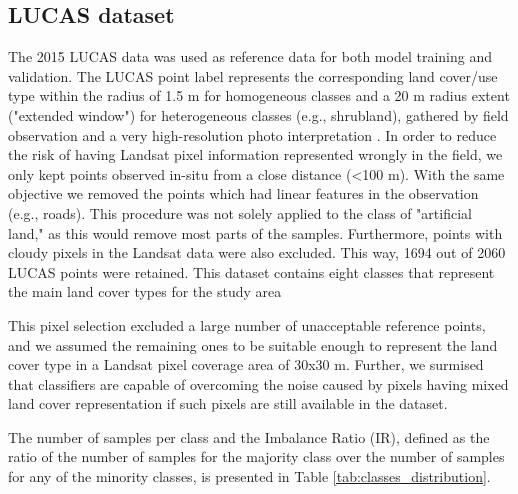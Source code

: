 \documentclass[remotesensing,article,submit,moreauthors,pdftex]{Definitions/mdpi}
\begin{document}
\subsection{LUCAS dataset}

The 2015 LUCAS data was used as reference data for both model training and
validation. The LUCAS point label represents the corresponding land cover/use
type within the radius of 1.5 m for homogeneous classes and a 20 m radius
extent ("extended window") for heterogeneous classes (e.g., shrubland), gathered
by field observation and a very high-resolution photo interpretation
\cite{LUCAS2015C1}. In order to reduce the risk of having Landsat pixel
information represented wrongly in the field, we only kept points observed
in-situ from a close distance (<100 m). With the same objective we removed the
points which had linear features in the observation (e.g., roads).
This procedure was not solely applied to the class of "artificial land," as
this would remove most parts of the samples. Furthermore, points with cloudy
pixels in the Landsat data were also excluded. This way, 1694 out of 2060
LUCAS points were retained. This dataset contains eight classes that
represent the main land cover types for the study area

This pixel selection excluded a large number of unacceptable reference points,
and we assumed the remaining ones to be suitable enough to represent the land
cover type in a Landsat pixel coverage area of 30x30 m. Further, we surmised
that classifiers are capable of overcoming the noise caused by pixels having
mixed land cover representation if such pixels are still available in the
dataset.

The number of samples per class and the Imbalance Ratio (IR), defined as the
ratio of the number of samples for the majority class over the number of samples for
any of the minority classes, is presented in Table
\ref{tab:classes_distribution}.
\end{document}
